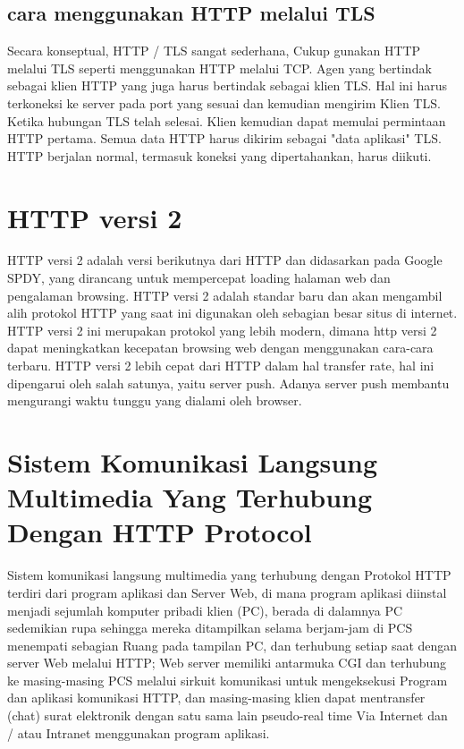 \subsection{cara menggunakan HTTP melalui TLS}
Secara konseptual, HTTP / TLS sangat sederhana, Cukup gunakan HTTP melalui TLS seperti menggunakan HTTP melalui TCP. Agen yang bertindak sebagai klien HTTP yang juga harus bertindak sebagai klien TLS. Hal ini harus terkoneksi ke server pada port yang sesuai dan kemudian mengirim Klien TLS. Ketika hubungan TLS telah selesai. Klien kemudian dapat memulai permintaan HTTP pertama. Semua data HTTP harus dikirim sebagai "data aplikasi" TLS. HTTP berjalan normal, termasuk koneksi yang dipertahankan, harus diikuti\cite{rescorla2000http}.

\section{HTTP versi 2}
HTTP versi 2 adalah versi berikutnya dari HTTP dan didasarkan pada Google SPDY, yang dirancang untuk mempercepat loading halaman web dan pengalaman browsing. HTTP versi 2 adalah standar baru dan akan mengambil alih protokol HTTP yang saat ini digunakan oleh sebagian besar situs di internet. HTTP versi 2 ini merupakan protokol yang lebih modern, dimana http versi 2 dapat meningkatkan kecepatan browsing web dengan menggunakan cara-cara terbaru. HTTP versi 2 lebih cepat dari HTTP dalam hal transfer rate, hal ini dipengarui oleh salah satunya, yaitu server push. Adanya server push membantu mengurangi waktu tunggu yang dialami oleh browser\cite{engku2016analisis}.

\section{Sistem Komunikasi Langsung Multimedia Yang Terhubung Dengan HTTP Protocol}
Sistem komunikasi langsung multimedia yang terhubung dengan Protokol HTTP terdiri dari program aplikasi dan Server Web, di mana program aplikasi diinstal menjadi sejumlah komputer pribadi klien (PC), berada di dalamnya PC sedemikian rupa sehingga mereka ditampilkan selama berjam-jam di PCS menempati sebagian Ruang pada tampilan PC, dan terhubung setiap saat dengan server Web melalui HTTP; Web server memiliki antarmuka CGI dan terhubung ke masing-masing PCS melalui sirkuit komunikasi untuk mengeksekusi Program dan aplikasi komunikasi HTTP, dan masing-masing klien dapat mentransfer (chat) surat elektronik dengan satu sama lain pseudo-real time Via Internet dan / atau Intranet menggunakan program aplikasi\citep{nishizawa2005multimedia}.